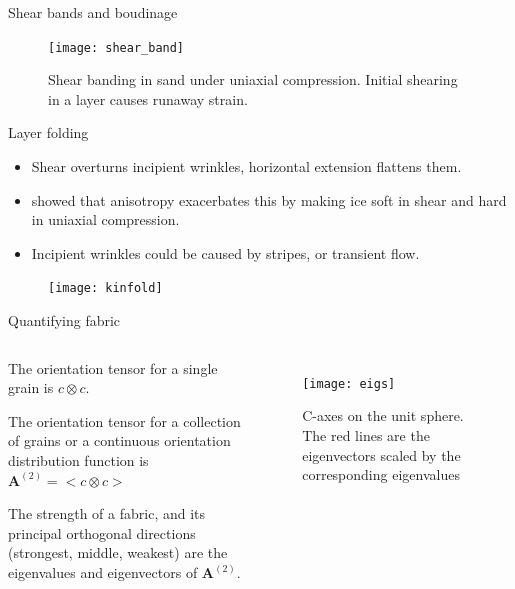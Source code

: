\documentclass{beamer}
\begin{document}
\begin{frame}{Shear bands and boudinage}
   \begin{figure}
      \texttt{[image: shear\_band]}
      \caption{Shear banding in sand under uniaxial compression. Initial shearing in a layer causes runaway strain.}
   \end{figure}
\end{frame}



\begin{frame}{Layer folding}
   \begin{itemize}
      \item Shear overturns incipient wrinkles, horizontal extension flattens them.
      \item \citet{alley97} showed that anisotropy exacerbates this by making ice soft in shear and hard in uniaxial compression.
      \item Incipient wrinkles could be caused by stripes, or transient flow.
   \end{itemize}
   \begin{figure}
      \texttt{[image: kinfold]}
      \caption{\citet{throstur2002}}
   \end{figure}
\end{frame}

\begin{frame}{Quantifying fabric}
   \begin{columns}[T]
      \begin{itemize}\small{
      \item The orientation tensor for a single grain is $c \otimes c$.
      \item The orientation tensor for a collection of grains or a continuous orientation distribution function is $\mathbf{A}^{(2)} = < c \otimes c>$
      \item The strength of a fabric, and its principal orthogonal directions (strongest, middle, weakest) are the eigenvalues and eigenvectors of $\mathbf{A}^{(2)}$.
      }
   \end{itemize}
   \begin{figure}
     \texttt{[image: eigs]}
      \caption{\tiny{C-axes on the unit sphere. The red lines are the eigenvectors scaled by the corresponding eigenvalues}}
   \end{figure}
 \end{columns}
\end{frame}
\end{document}
